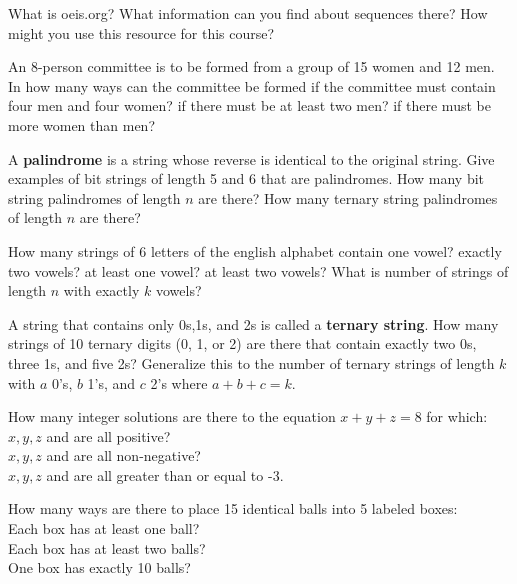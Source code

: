 \begin{exercise}
What is oeis.org?  What information can you find about sequences there?  How might you use this resource for this course?
\end{exercise}

\begin{exercise}
An 8-person committee is to be formed from a group of 15 women and 12 men.  In how many ways can the committee be formed if the committee must contain four men and four women? if there must be at least two men?  if there must be more women than men?
\end{exercise}

\begin{exercise}
A {\bf palindrome} is a string whose reverse is identical to the original string.  Give examples of bit strings of length 5 and 6 that are palindromes. How many bit string palindromes of length $n$ are there?  How many ternary string palindromes of length $n$ are there?
\end{exercise}

\begin{exercise}
How many strings of 6 letters of the english alphabet contain one vowel? exactly two vowels? at least one vowel? at least two vowels? What is number of strings of length $n$ with exactly $k$ vowels?
\end{exercise}

\begin{exercise} 
A string that contains only 0s,1s, and 2s is called a {\bf ternary string}. How many strings of 10 ternary digits (0, 1, or 2) are there that contain exactly two 0s, three 1s, and five 2s?   Generalize this to the number of ternary strings of length $k$ with $a$ 0's, $b$ 1's, and $c$ 2's where $a+b+c=k$.
\end{exercise}

\begin{exercise}
How many integer solutions are there to the equation $x+y+z=8$ for which:
$x,y ,z$ and  are all positive?\\
$x,y ,z$ and  are all non-negative?\\
$x,y ,z$ and  are all greater than or equal to -3.\\
\end{exercise}

\begin{exercise}
How many ways are there to place 15 identical balls into 5 labeled boxes:\\
Each box has at least one ball?\\
Each box has at least two balls?\\
One box has exactly 10 balls?\\
\end{exercise}

